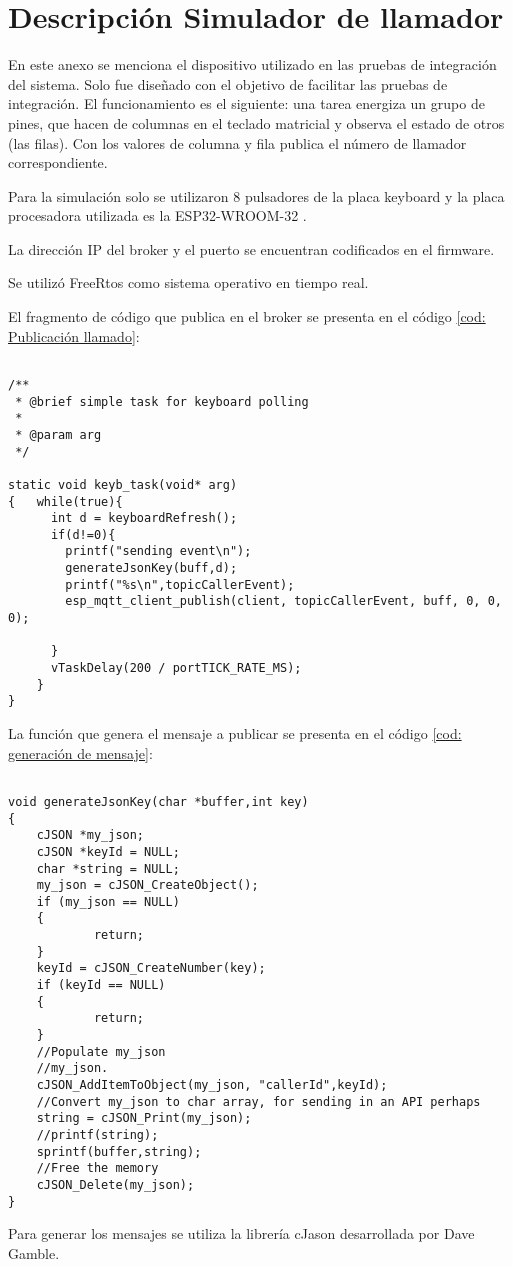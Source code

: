 
\chapter{Descripción Simulador de llamador} %

\label{AppendixA} %

En este anexo se menciona el dispositivo utilizado en las pruebas de integración del sistema. Solo fue diseñado con el objetivo de facilitar las pruebas de integración. El funcionamiento es el siguiente: una tarea energiza un grupo de pines, que hacen de columnas en el teclado matricial y observa el estado de otros (las filas). Con los valores de columna y fila publica el número de llamador correspondiente. 

Para la simulación solo se utilizaron 8 pulsadores de la placa keyboard  \citep{WEBSITE:37} y la placa procesadora utilizada es la ESP32-WROOM-32 \citep{WEBSITE:38}. 

La dirección IP del broker y el puerto se encuentran codificados en el firmware.

Se utilizó FreeRtos \citep{WEBSITE:40} como sistema operativo en tiempo real.

El fragmento de código que publica en el broker se presenta en el código \ref{cod: Publicación llamado}:

\begin{lstlisting}[label=cod: Publicación llamado,caption=Tarea que publica en el broker la simulación de la llamada.]

/**
 * @brief simple task for keyboard polling
 * 
 * @param arg 
 */

static void keyb_task(void* arg)
{   while(true){
      int d = keyboardRefresh();
      if(d!=0){
        printf("sending event\n");
        generateJsonKey(buff,d);
        printf("%s\n",topicCallerEvent);
        esp_mqtt_client_publish(client, topicCallerEvent, buff, 0, 0, 0);

      }
      vTaskDelay(200 / portTICK_RATE_MS);
    }
}
\end{lstlisting}

La función que genera el mensaje a publicar se presenta en el código \ref{cod: generación de mensaje}:

\begin{lstlisting}[label=cod: generación de mensaje,caption= Función que genera el payload.]

void generateJsonKey(char *buffer,int key)
{
	cJSON *my_json;
	cJSON *keyId = NULL;
	char *string = NULL;    
	my_json = cJSON_CreateObject();
	if (my_json == NULL)
	{
			return;
	}
	keyId = cJSON_CreateNumber(key);
	if (keyId == NULL)
	{
			return;
	}    
	//Populate my_json
	//my_json.
	cJSON_AddItemToObject(my_json, "callerId",keyId);
	//Convert my_json to char array, for sending in an API perhaps
	string = cJSON_Print(my_json);
	//printf(string);
	sprintf(buffer,string);
	//Free the memory
	cJSON_Delete(my_json);
}

\end{lstlisting}

Para generar los mensajes se utiliza la librería cJason desarrollada por Dave Gamble.
